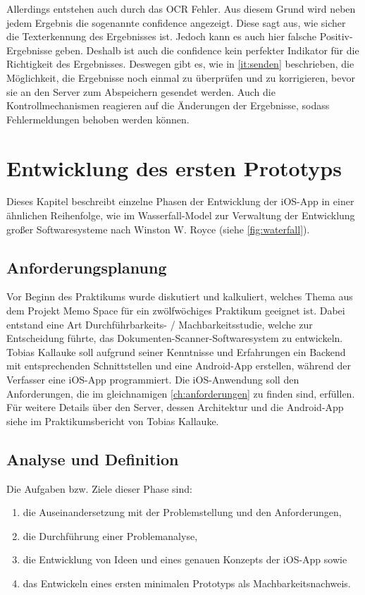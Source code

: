 \documentclass[notables, nomenclature, oneside, 150]{HSMW-Thesis}
\begin{document}
		Allerdings entstehen auch durch das OCR Fehler. Aus diesem Grund wird neben jedem Ergebnis die sogenannte confidence angezeigt. Diese sagt aus, wie sicher die Texterkennung des Ergebnisses ist. Jedoch kann es auch hier falsche Positiv-Ergebnisse geben. Deshalb ist auch die confidence kein perfekter Indikator für die Richtigkeit des Ergebnisses. Deswegen gibt es, wie in \autoref{it:senden} beschrieben, die Möglichkeit, die Ergebnisse noch einmal zu überprüfen und zu korrigieren, bevor sie an den Server zum Abspeichern gesendet werden. Auch die Kontrollmechanismen reagieren auf die Änderungen der Ergebnisse, sodass Fehlermeldungen behoben werden können.


\chapter{Entwicklung des ersten Prototyps}\label{ch:prototyp}
	Dieses Kapitel beschreibt einzelne Phasen der Entwicklung der iOS-App in einer ähnlichen Reihenfolge, wie im Wasserfall-Model zur Verwaltung der Entwicklung großer Softwaresysteme nach Winston W. Royce \cite{royce_managing_1970} (siehe \autoref{fig:waterfall}).
    	
	\section{Anforderungsplanung}\label{sc:anforderungsplanung}
	Vor Beginn des Praktikums wurde diskutiert und kalkuliert, welches Thema aus dem Projekt Memo Space für ein zwölfwöchiges Praktikum geeignet ist. Dabei entstand eine Art Durchführbarkeits- / Machbarkeitsstudie, welche zur Entscheidung führte, das Dokumenten-Scanner-Softwaresystem zu entwickeln. Tobias Kallauke soll aufgrund seiner Kenntnisse und Erfahrungen ein Backend mit entsprechenden Schnittstellen und eine Android-App erstellen, während der Verfasser eine iOS-App programmiert. Die iOS-Anwendung soll den Anforderungen, die im gleichnamigen \autoref{ch:anforderungen} zu finden sind, erfüllen. Für weitere Details über den Server, dessen Architektur und die Android-App siehe im Praktikumsbericht von Tobias Kallauke.


\section{Analyse und Definition}\label{sc:analyse}
		Die Aufgaben bzw. Ziele dieser Phase sind: 
		\vspace{-5mm}
		\begin{enumerate}
			\item die Auseinandersetzung mit der Problemstellung und den Anforderungen,
			\item die Durchführung einer Problemanalyse,
			\item die Entwicklung von Ideen und eines genauen Konzepts der iOS-App sowie 
			\item das Entwickeln eines ersten minimalen Prototyps als Machbarkeitsnachweis.
		\end{enumerate}
\end{document}
